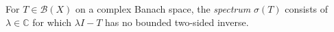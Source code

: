 
For $T\in\mathcal B(X)$ on a complex Banach space, the \emph{spectrum} $\sigma(T)$ consists of $\lambda\in\mathbb C$ for which $\lambda I-T$ has no bounded two-sided inverse.
